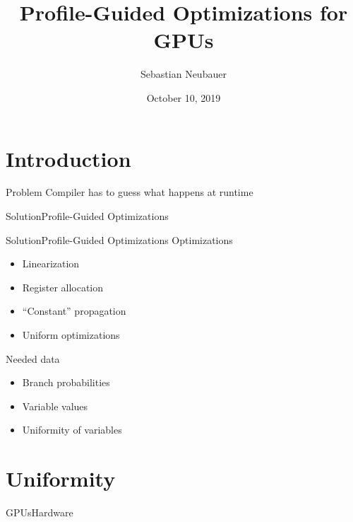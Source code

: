 \documentclass[xcolor={usenames,dvipsnames}, aspectratio=169, 12pt]{beamer}
\title[Master Thesis]{Profile-Guided Optimizations for GPUs}
\author[S. Neubauer]{Sebastian Neubauer}
\date{October 10, 2019}
\institute{Technische Universität München}
\begin{document}
\frame[plain]{\titlepage}

\section{Introduction}

\begin{frame}{Problem}
\large Compiler has to guess what happens at runtime
\end{frame}

\begin{frame}{Solution}{Profile-Guided Optimizations}
\centering

\end{frame}

\begin{frame}{Solution}{Profile-Guided Optimizations}
Optimizations
\begin{itemize}
	\item Linearization
	\item Register allocation
	\item \enquote{Constant} propagation
	\item Uniform optimizations
\end{itemize}
\vspace{0.5cm}
Needed data
\begin{itemize}
	\item Branch probabilities
	\item Variable values
	\item Uniformity of variables
\end{itemize}
\end{frame}

\section{Uniformity}

\begin{frame}[fragile]{GPUs}{Hardware}
\begin{center}

\end{center}

\end{frame}
\end{document}

